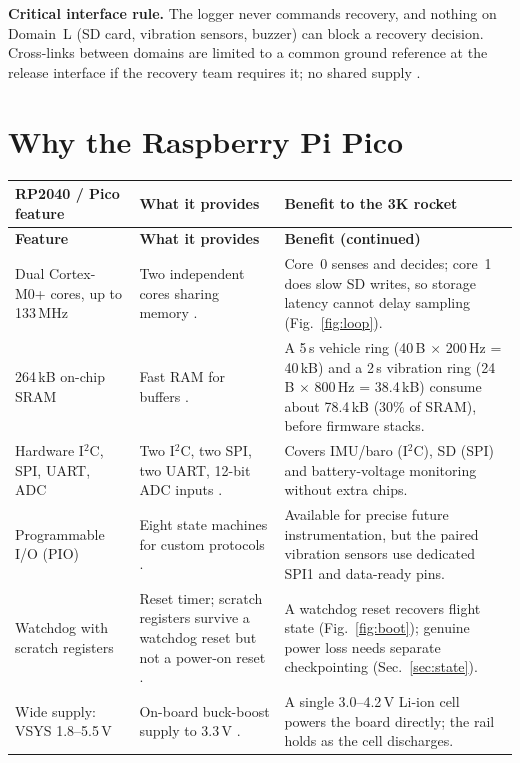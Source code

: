 \textbf{Critical interface rule.} The logger never commands recovery, and nothing on Domain~L (SD card, vibration sensors, buzzer) can block a recovery decision. Cross-links between domains are limited to a common ground reference at the release interface if the recovery team requires it; no shared supply \cite{rtc2027app03}.

\section{Why the Raspberry Pi Pico}
\small
\begingroup
{}
\begin{longtable}{@{}L{36mm}L{58mm}L{56mm}@{}}
\toprule{}\textbf{RP2040 / Pico feature}&\textbf{What it provides}&\textbf{Benefit to the 3K rocket}\\\midrule\endfirsthead
\toprule{}\textbf{Feature}&\textbf{What it provides}&\textbf{Benefit (continued)}\\\midrule\endhead
\bottomrule\endlastfoot
Dual Cortex-M0+ cores, up to 133\,MHz & Two independent cores sharing memory \cite{rp2040ds}. & Core~0 senses and decides; core~1 does slow SD writes, so storage latency cannot delay sampling (Fig.~\ref{fig:loop}).\\
264\,kB on-chip SRAM & Fast RAM for buffers \cite{rp2040ds}. & A 5\,s vehicle ring (40\,B $\times$ 200\,Hz = 40\,kB) and a 2\,s vibration ring (24\,B $\times$ 800\,Hz = 38.4\,kB) consume about 78.4\,kB (30\% of SRAM), before firmware stacks.\\
Hardware I$^2$C, SPI, UART, ADC & Two I$^2$C, two SPI, two UART, 12-bit ADC inputs \cite{rp2040ds}. & Covers IMU/baro (I$^2$C), SD (SPI) and battery-voltage monitoring without extra chips.\\
Programmable I/O (PIO) & Eight state machines for custom protocols \cite{rp2040ds}. & Available for precise future instrumentation, but the paired vibration sensors use dedicated SPI1 and data-ready pins.\\
Watchdog with scratch registers & Reset timer; scratch registers survive a watchdog reset but not a power-on reset \cite{rp2040ds}. & A watchdog reset recovers flight state (Fig.~\ref{fig:boot}); genuine power loss needs separate checkpointing (Sec.~\ref{sec:state}).\\
Wide supply: VSYS 1.8--5.5\,V & On-board buck-boost supply to 3.3\,V \cite{picods}. & A single 3.0--4.2\,V Li-ion cell powers the board directly; the rail holds as the cell discharges.\\

\end{longtable}
